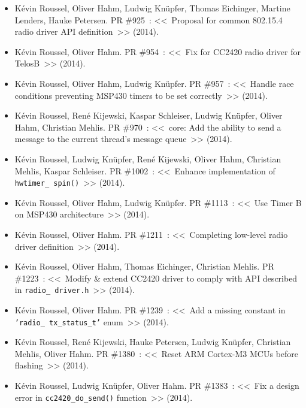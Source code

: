 \begin{itemize}
\item Kévin Roussel, Oliver Hahm, Ludwig Knüpfer, Thomas Eichinger,
      Martine Lenders, Hauke Petersen.
PR \#925~: <<~Proposal for common 802.15.4 radio driver API definition~>>
(2014).

\item Kévin Roussel, Oliver Hahm.
PR \#954~: <<~Fix for CC2420 radio driver for TelosB~>>
(2014).

\item Kévin Roussel, Oliver Hahm, Ludwig Knüpfer.
PR \#957~: <<~Handle race conditions preventing MSP430 timers to be set
              correctly~>>
(2014).

\item Kévin Roussel, René Kijewski, Kaspar Schleiser, Ludwig Knüpfer,
      Oliver Hahm, Christian Mehlis.
PR \#970~: <<~core: Add the ability to send a message to the current
              thread's message queue~>>
(2014).

\item Kévin Roussel, Ludwig Knüpfer, René Kijewski, Oliver Hahm,
      Christian Mehlis, Kaspar Schleiser.
PR \#1002~: <<~Enhance implementation of \texttt{hwtimer\_ spin()}~>>
(2014).

\item Kévin Roussel, Oliver Hahm, Ludwig Knüpfer.
PR \#1113~: <<~Use Timer B on MSP430 architecture~>>
(2014).

\item Kévin Roussel, Oliver Hahm.
PR \#1211~: <<~Completing low-level radio driver definition~>>
(2014).

\item Kévin Roussel, Oliver Hahm, Thomas Eichinger, Christian Mehlis.
PR \#1223~: <<~Modify \& extend CC2420 driver to comply with API described
               in \texttt{radio\_ driver.h}~>>
(2014).

\item Kévin Roussel, Oliver Hahm.
PR \#1239~: <<~Add a missing constant in \texttt{'radio\_ tx\_status\_t'}
               enum~>>
(2014).

\item Kévin Roussel, René Kijewski, Hauke Petersen, Ludwig Knüpfer,
      Christian Mehlis, Oliver Hahm.
PR \#1380~: <<~Reset ARM Cortex-M3 MCUs before flashing~>>
(2014).

\item Kévin Roussel, Ludwig Knüpfer, Oliver Hahm.
PR \#1383~: <<~Fix a design error in \texttt{cc2420\_do\_send()} function~>>
(2014).


\end{itemize}

